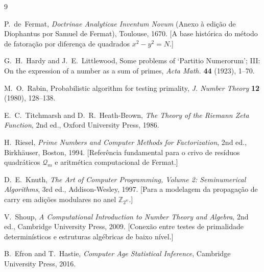 \documentclass[12pt,a4paper]{article}
\theoremstyle{plain}
\begin{document}
\renewcommand{\refname}{Referências}
\begin{thebibliography}{9}

P.~de~Fermat,
{\it Doctrinae Analyticae Inventum Novum} (Anexo à edição de Diophantus
por Samuel de Fermat), Toulouse, 1670.
[A base histórica do método de fatoração por diferença de quadrados
$x^2 - y^2 = N$.]

G.~H.~Hardy and J.~E.~Littlewood,
Some problems of `Partitio Numerorum'; III: On the expression of a number
as a sum of primes,
{\it Acta Math.} \textbf{44} (1923), 1--70.

M.~O.~Rabin,
Probabilistic algorithm for testing primality,
{\it J. Number Theory} \textbf{12} (1980), 128--138.

E.~C.~Titchmarsh and D.~R.~Heath-Brown,
{\it The Theory of the Riemann Zeta Function},
2nd ed., Oxford University Press, 1986.

H.~Riesel,
{\it Prime Numbers and Computer Methods for Factorization},
2nd ed., Birkhäuser, Boston, 1994.
[Referência fundamental para o crivo de resíduos quadráticos
$\mathcal{Q}_m$ e aritmética computacional de Fermat.]

D.~E.~Knuth,
{\it The Art of Computer Programming, Volume 2: Seminumerical Algorithms},
3rd ed., Addison-Wesley, 1997.
[Para a modelagem da propagação de carry em adições modulares
no anel $\mathbb{Z}_{2^w}$.]

V.~Shoup,
{\it A Computational Introduction to Number Theory and Algebra},
2nd ed., Cambridge University Press, 2009.
[Conexão entre testes de primalidade determinísticos e estruturas
algébricas de baixo nível.]

B.~Efron and T.~Hastie,
{\it Computer Age Statistical Inference},
Cambridge University Press, 2016.

\end{thebibliography}
\end{document}
